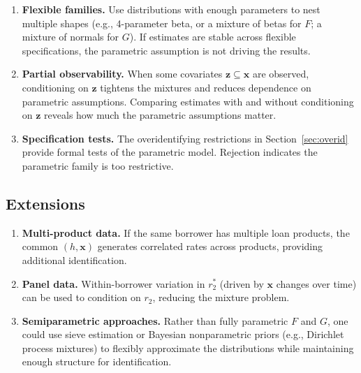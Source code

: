 \documentclass[12pt]{article}
\theoremstyle{plain}
\theoremstyle{plain}
\theoremstyle{definition}  %
\theoremstyle{remark}  %
\begin{document}
\begin{enumerate}
    \item \textbf{Flexible families.}  Use distributions with enough parameters to nest multiple shapes (e.g., 4-parameter beta, or a mixture of betas for $F$; a mixture of normals for $G$).  If estimates are stable across flexible specifications, the parametric assumption is not driving the results.
    
    \item \textbf{Partial observability.} When some covariates $\mathbf{z} \subseteq \mathbf{x}$ are observed, conditioning on $\mathbf{z}$ tightens the mixtures and reduces dependence on parametric assumptions.  Comparing estimates with and without conditioning on $\mathbf{z}$ reveals how much the parametric assumptions matter.
    
    \item \textbf{Specification tests.} The overidentifying restrictions in Section~\ref{sec:overid} provide formal tests of the parametric model.  Rejection indicates the parametric family is too restrictive.
\end{enumerate}

\subsection{Extensions}

\begin{enumerate}
    \item \textbf{Multi-product data.}  If the same borrower has multiple loan products, the common $(h, \mathbf{x})$ generates correlated rates across products, providing additional identification.
    
    \item \textbf{Panel data.}  Within-borrower variation in $r_2^*$ (driven by $\mathbf{x}$ changes over time) can be used to condition on $r_2$, reducing the mixture problem.
    
    \item \textbf{Semiparametric approaches.}  Rather than fully parametric $F$ and $G$, one could use sieve estimation or Bayesian nonparametric priors (e.g., Dirichlet process mixtures) to flexibly approximate the distributions while maintaining enough structure for identification.
\end{enumerate}
\end{document}
